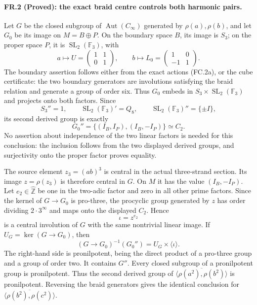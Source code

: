 \paragraph{FR.2 (Proved): the exact braid centre controls both harmonic pairs.}
Let $G$ be the closed subgroup of $\operatorname{Aut}(C_\infty)$
generated by $\rho(a),\rho(b)$, and let $G_0$ be its image
on $M=B\oplus P$. On the boundary space $B$, its image
is $S_3$; on the proper space $P$, it is
$\operatorname{SL}_2(\mathbb F_3)$, with
\[
 a\longmapsto U=\begin{pmatrix}1&1\\0&1\end{pmatrix},
 \qquad
 b\longmapsto L_0=\begin{pmatrix}1&0\\-1&1\end{pmatrix}.
 \tag{FR.2a}
\]
The boundary assertion follows either from the exact actions
(FC.2a), or the cube certificate: the two boundary generators
are involutions satisfying the braid relation and generate
a group of order six. Thus $G_0$ embeds in
$S_3\times\operatorname{SL}_2(\mathbb F_3)$ and projects
onto both factors. Since
\[
 S_3''=1,\qquad
 \operatorname{SL}_2(\mathbb F_3)'=Q_8,\qquad
 \operatorname{SL}_2(\mathbb F_3)''=\{\pm I\},
\]
its second derived group is exactly
\[
              G_0''=\{(I_B,I_P),(I_B,-I_P)\}\simeq C_2.
 \tag{FR.2b}
\]
No assertion about independence of the two linear factors is
needed for this conclusion: the inclusion follows from the
two displayed derived groups, and surjectivity onto the proper
factor proves equality.

The source element $z_3=(ab)^3$ is central in the actual
three-strand section. Its image $z=\rho(z_3)$ is therefore
central in $G$. On $M$ it has the value $(I_B,-I_P)$.
Let $e_2\in\widehat{\mathbb Z}$ be one in the two-adic
factor and zero in all other prime factors. Since the kernel
of $G\to G_0$ is pro-three, the procyclic group generated
by $z$ has order dividing $2\cdot3^\infty$ and maps onto
the displayed $C_2$. Hence
\[
                         \iota=z^{e_2}
\]
is a central involution of $G$ with the same nontrivial
linear image. If $U_G=\ker(G\to G_0)$, then
\[
  (G\longrightarrow G_0)^{-1}(G_0'')
                 =U_G\times\langle\iota\rangle.
 \tag{FR.2c}
\]
The right-hand side is pronilpotent, being the direct product
of a pro-three group and a group of order two. It contains
$G''$. Every closed subgroup of a pronilpotent group is
pronilpotent. Thus the second derived group of
$\overline{\langle\rho(a^2),\rho(b^2)\rangle}$ is
pronilpotent. Reversing the braid generators gives the identical
conclusion for
$\overline{\langle\rho(b^2),\rho(c^2)\rangle}$.

